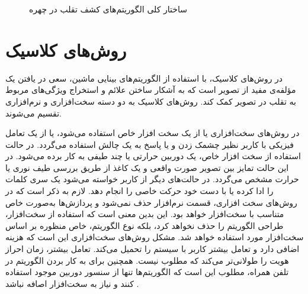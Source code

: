 \begin{figure}[ht]
\caption{ساختار کلی الگوریتم‌های کشف تقلب در چهره}
\label{fig:algs}
\end{figure}
\section{روش‌های کلاسیک}
در روش‌های کلاسیک، با استفاده از الگوریتم‌های بینایی ماشین، سعی در یافتن یک مؤلفه‌ی مفید از تصویر است که به آشکار ساختن  علائم و استخراج ویژگی‌های مربوط به تقلب در تصویر کمک کند. روش‌های کلاسیک به دو دسته سخت‌افزاری و نرم‌افزاری تقسیم می‌شوند.
\cite{ramachandra2017presentation}


در روش‌های سخت‌افزاری یا از یک سخت افزار خاص استفاده می‌شود، یا از یک تعامل فیزیکی با کاربر نظیر چشمک زدن و یا پاسخ به یک چالش استفاده می‌گردد.
در حالت استفاده از سخت افزار خاص، یک دوربین حرارتی یا چند طیفی به کار برده می‌شود. در این حالت تمایز بین تصویر صورت واقعی و یک کاغذ از طریق بررسی طیف نوری یا حرارت مشخص می‌گردد. در حالت‌های دیگر از کاربر خواسته می‌شود یک سری کلمات را ادا کرده یا با دست خود حرکت خاصی را انجام دهد.
لازم به ذکر است که در روش‌های سخت افزاری، قسمت نرم‌افزار حذف نمی‌شود و پردازش‌ها به‌صورت خاص متناسب با سخت‌افزار خواهد بود. این بدین معنی است که استفاده از سخت‌افزار، طراحی الگوریتم را حذف نخواهد کرد، بلکه نوع الگوریتم، خاص منظوره بر اساس سخت‌افزار مورد استفاده خواهد شد.
مشکل روش‌های سخت‌افزاری این است که هزینه اضافی دارد و تعامل بیشتر کاربر با سیستم را تحمیل می‌کند. تعامل بیشتر، زمان احراز هویت را طولانی‌تر می‌کند که مطلوب نیست. همچنین برای به کار بردن الگوریتم در تلفن همراه، مطلوب این است که الگوریتم‌ها تنها از سنسور دوربین موجود استفاده کنند و نیاز به سخت‌افزار اصافه نباشد
\cite{ramachandra2017presentation}.

